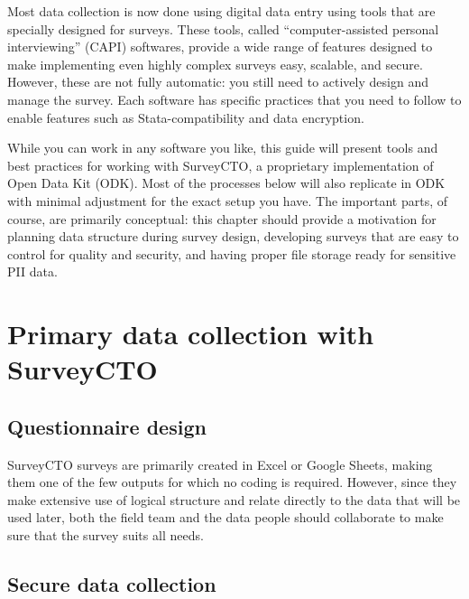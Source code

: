 
\begin{fullwidth}
Most data collection is now done using digital data entry
using tools that are specially designed for surveys.
These tools, called ``computer-assisted personal interviewing'' (CAPI) softwares,
provide a wide range of features designed to make
implementing even highly complex surveys easy, scalable, and secure.
However, these are not fully automatic:
you still need to actively design and manage the survey.
Each software has specific practices that you need to follow
to enable features such as Stata-compatibility and data encryption.

While you can work in any software you like,
this guide will present tools and best practices
for working with SurveyCTO, a proprietary implementation of Open Data Kit (ODK).
Most of the processes below will also replicate in ODK
with minimal adjustment for the exact setup you have.
The important parts, of course, are primarily conceptual:
this chapter should provide a motivation for
planning data structure during survey design,
developing surveys that are easy to control for quality and security,
and having proper file storage ready for sensitive PII data.
\end{fullwidth}


\section{Primary data collection with SurveyCTO}

\subsection{Questionnaire design}

SurveyCTO surveys are primarily created in Excel or Google Sheets,
making them one of the few outputs for which no coding is required.
However, since they make extensive use of logical structure and
relate directly to the data that will be used later,
both the field team and the data people should
collaborate to make sure that the survey suits all needs.

\subsection{Secure data collection}

